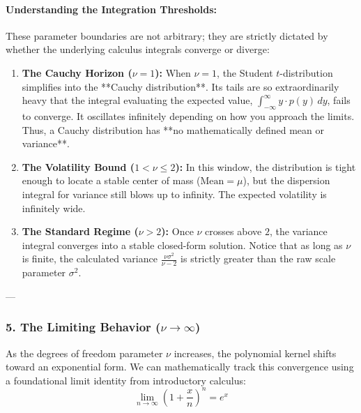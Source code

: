 \documentclass{article}
\begin{document}
\paragraph{Understanding the Integration Thresholds:}
These parameter boundaries are not arbitrary; they are strictly dictated by whether the underlying calculus integrals converge or diverge:
\begin{enumerate}
    \item \textbf{The Cauchy Horizon ($\nu = 1$):} When $\nu = 1$, the Student $t$-distribution simplifies into the **Cauchy distribution**. Its tails are so extraordinarily heavy that the integral evaluating the expected value, $\int_{-\infty}^{\infty} y \cdot p(y) \, dy$, fails to converge. It oscillates infinitely depending on how you approach the limits. Thus, a Cauchy distribution has **no mathematically defined mean or variance**.
    \item \textbf{The Volatility Bound ($1 < \nu \le 2$):} In this window, the distribution is tight enough to locate a stable center of mass ($\text{Mean} = \mu$), but the dispersion integral for variance still blows up to infinity. The expected volatility is infinitely wide.
    \item \textbf{The Standard Regime ($\nu > 2$):} Once $\nu$ crosses above $2$, the variance integral converges into a stable closed-form solution. Notice that as long as $\nu$ is finite, the calculated variance $\frac{\nu\sigma^2}{\nu-2}$ is strictly greater than the raw scale parameter $\sigma^2$.
\end{enumerate}

---

\subsubsection*{5. The Limiting Behavior ($\nu \to \infty$)}
As the degrees of freedom parameter $\nu$ increases, the polynomial kernel shifts toward an exponential form. We can mathematically track this convergence using a foundational limit identity from introductory calculus:
\begin{equation}
    \lim_{n \to \infty} \left( 1 + \frac{x}{n} \right)^n = e^x
\end{equation}
\end{document}
